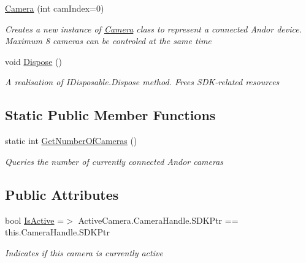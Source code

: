 \begin{DoxyCompactItemize}
\hyperlink{class_a_n_d_o_r___c_s_1_1_classes_1_1_camera_ae095295c5e29f6b143a811eec79aa072}{Camera} (int cam\+Index=0)
\begin{DoxyCompactList}\small\item\em Creates a new instance of \hyperlink{class_a_n_d_o_r___c_s_1_1_classes_1_1_camera}{Camera} class to represent a connected Andor device. Maximum 8 cameras can be controled at the same time \end{DoxyCompactList}\item 
void \hyperlink{class_a_n_d_o_r___c_s_1_1_classes_1_1_camera_a0a6c90ea995444043ce9bd37b9fad334}{Dispose} ()
\begin{DoxyCompactList}\small\item\em A realisation of I\+Disposable.\+Dispose method. Frees S\+D\+K-\/related resources \end{DoxyCompactList}\end{DoxyCompactItemize}
\subsection*{Static Public Member Functions}
\begin{DoxyCompactItemize}
\item 
static int \hyperlink{class_a_n_d_o_r___c_s_1_1_classes_1_1_camera_aad5087de881575f5184615caf1fad61a}{Get\+Number\+Of\+Cameras} ()
\begin{DoxyCompactList}\small\item\em Queries the number of currently connected Andor cameras \end{DoxyCompactList}\end{DoxyCompactItemize}
\subsection*{Public Attributes}
\begin{DoxyCompactItemize}
\item 
bool \hyperlink{class_a_n_d_o_r___c_s_1_1_classes_1_1_camera_a1cac90fda13e8159614d72bc00dff514}{Is\+Active} =$>$ Active\+Camera.\+Camera\+Handle.\+S\+D\+K\+Ptr == this.\+Camera\+Handle.\+S\+D\+K\+Ptr
\begin{DoxyCompactList}\small\item\em Indicates if this camera is currently active \end{DoxyCompactList}\end{DoxyCompactItemize}
